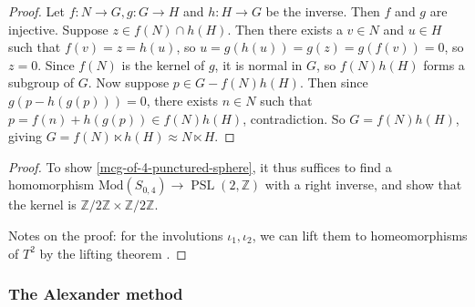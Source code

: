 \documentclass[reqno]{amsart}
\theoremstyle{definition}
\theoremstyle{remark}
\DeclareMathOperator{\PSL}{PSL}
\newcommand{\Mod}{{\mathrm{Mod}}}
\begin{document}
\begin{proof}
    Let $f \colon N \to G, g \colon G \to H$ and
    $h \colon H \to G$ be the inverse. Then
    $f$ and $g$ are injective. Suppose
    $z \in f(N) \cap h(H)$. Then there exists a
    $v \in N$ and $u \in H$ such that
    $f(v) = z = h(u)$, so 
    $u = g\left( h(u) \right) = g(z)
    = g(f(v)) = 0$, so $z = 0$.
    Since $f(N)$ is the kernel of $g$, it is
    normal in $G$, so $f(N) h(H)$ forms
    a subgroup of $G$. Now suppose
    $p \in G - f(N)h(H)$. Then since
    $g\left( p - h(g(p)) \right) = 0$, there
    exists $n \in N$ such that
    $p = f(n) + h(g(p)) \in f(N) h(H)$, contradiction.
    So $G = f(N) h(H)$, giving $G = f(N) \ltimes h(H)
    \approx N \ltimes H$.
\end{proof}

\begin{proof}
    To show \ref{mcg-of-4-punctured-sphere}, it
    thus suffices to find a homomorphism
    $\Mod \left( S_{0,4} \right) \to 
    \PSL \left( 2, \mathbb{Z} \right) $ with a right
    inverse, and show that the kernel
    is $\mathbb{Z} /2 \mathbb{Z} \times \mathbb{Z} / 2 \mathbb{Z}$.

    Notes on the proof: for the involutions
    $\iota_1, \iota_2$, we can lift them
    to homeomorphisms of $T^2$ by the lifting theorem
    \cite[Thm~4.1]{Bredon}. 
\end{proof}


\subsubsection{The Alexander method}
\end{document}
